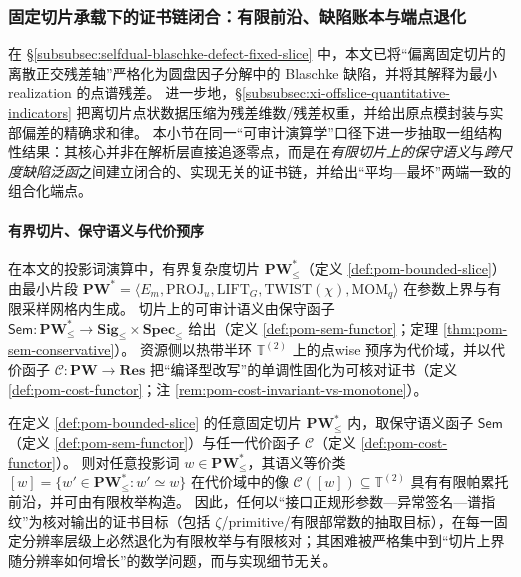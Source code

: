 \subsubsection{固定切片承载下的证书链闭合：有限前沿、缺陷账本与端点退化}\label{subsubsec:xi-fixed-slice-audit-chain}
在 \S\ref{subsubsec:selfdual-blaschke-defect-fixed-slice} 中，本文已将“偏离固定切片的离散正交残差轴”严格化为圆盘因子分解中的 Blaschke 缺陷，并将其解释为最小 realization 的点谱残差。
进一步地，\S\ref{subsubsec:xi-offslice-quantitative-indicators} 把离切片点状数据压缩为残差维数/残差权重，并给出原点模封装与实部偏差的精确求和律。
本小节在同一“可审计演算学”口径下进一步抽取一组结构性结果：其核心并非在解析层直接追逐零点，而是在\emph{有限切片上的保守语义}与\emph{跨尺度缺陷泛函}之间建立闭合的、实现无关的证书链，并给出“平均—最坏”两端一致的组合化端点。

\paragraph{有界切片、保守语义与代价预序}
在本文的投影词演算中，有界复杂度切片 \(\mathbf{PW}^{\ast}_{\le}\)（定义 \ref{def:pom-bounded-slice}）由最小片段
\(
\mathbf{PW}^{\ast}=\langle E_m,\mathrm{PROJ}_u,\mathrm{LIFT}_G,\mathrm{TWIST}(\chi),\mathrm{MOM}_q\rangle
\)
在参数上界与有限采样网格内生成。
切片上的可审计语义由保守函子
\(
\mathsf{Sem}:\mathbf{PW}^{\ast}_{\le}\to \mathbf{Sig}_{\le}\times\mathbf{Spec}_{\le}
\)
给出（定义 \ref{def:pom-sem-functor}；定理 \ref{thm:pom-sem-conservative}）。
资源侧以热带半环 \(\mathbb{T}^{(2)}\) 上的点wise 预序为代价域，并以代价函子 \(\mathcal{C}:\mathbf{PW}\to\mathbf{Res}\) 把“编译型改写”的单调性固化为可核对证书（定义 \ref{def:pom-cost-functor}；注 \ref{rem:pom-cost-invariant-vs-monotone}）。

\begin{theorem}\label{thm:xi-finite-frontier-certificate}
在定义 \ref{def:pom-bounded-slice} 的任意固定切片 \(\mathbf{PW}^{\ast}_{\le}\) 内，取保守语义函子 \(\mathsf{Sem}\)（定义 \ref{def:pom-sem-functor}）与任一代价函子 \(\mathcal{C}\)（定义 \ref{def:pom-cost-functor}）。
则对任意投影词 \(w\in \mathbf{PW}^{\ast}_{\le}\)，其语义等价类
\(
[w]=\{w'\in\mathbf{PW}^{\ast}_{\le}:w'\simeq w\}
\)
在代价域中的像 \(\mathcal{C}([w])\subseteq \mathbb{T}^{(2)}\) 具有有限帕累托前沿，并可由有限枚举构造。
因此，任何以“接口正规形参数—异常签名—谱指纹”为核对输出的证书目标（包括 \(\zeta\)/primitive/有限部常数的抽取目标），在每一固定分辨率层级上必然退化为有限枚举与有限核对；其困难被严格集中到“切片上界随分辨率如何增长”的数学问题，而与实现细节无关。
\end{theorem}


